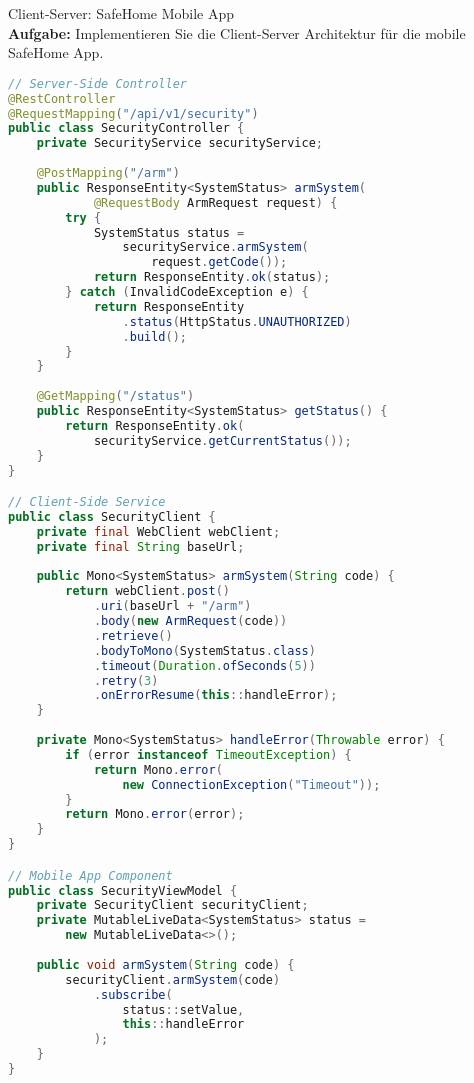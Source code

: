 \begin{example2}{Client-Server: SafeHome Mobile App}\\
\textbf{Aufgabe:} Implementieren Sie die Client-Server Architektur für die mobile SafeHome App.

\begin{lstlisting}[language=Java, style=basesmol]
// Server-Side Controller
@RestController
@RequestMapping("/api/v1/security")
public class SecurityController {
    private SecurityService securityService;
    
    @PostMapping("/arm")
    public ResponseEntity<SystemStatus> armSystem(
            @RequestBody ArmRequest request) {
        try {
            SystemStatus status = 
                securityService.armSystem(
                    request.getCode());
            return ResponseEntity.ok(status);
        } catch (InvalidCodeException e) {
            return ResponseEntity
                .status(HttpStatus.UNAUTHORIZED)
                .build();
        }
    }
    
    @GetMapping("/status")
    public ResponseEntity<SystemStatus> getStatus() {
        return ResponseEntity.ok(
            securityService.getCurrentStatus());
    }
}

// Client-Side Service
public class SecurityClient {
    private final WebClient webClient;
    private final String baseUrl;
    
    public Mono<SystemStatus> armSystem(String code) {
        return webClient.post()
            .uri(baseUrl + "/arm")
            .body(new ArmRequest(code))
            .retrieve()
            .bodyToMono(SystemStatus.class)
            .timeout(Duration.ofSeconds(5))
            .retry(3)
            .onErrorResume(this::handleError);
    }
    
    private Mono<SystemStatus> handleError(Throwable error) {
        if (error instanceof TimeoutException) {
            return Mono.error(
                new ConnectionException("Timeout"));
        }
        return Mono.error(error);
    }
}

// Mobile App Component
public class SecurityViewModel {
    private SecurityClient securityClient;
    private MutableLiveData<SystemStatus> status = 
        new MutableLiveData<>();
    
    public void armSystem(String code) {
        securityClient.armSystem(code)
            .subscribe(
                status::setValue,
                this::handleError
            );
    }
}
\end{lstlisting}
\end{example2}

